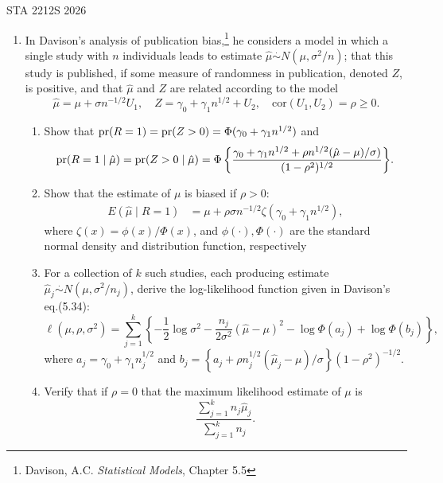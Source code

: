\documentclass[12pt]{article}
\def\dotsim{\stackrel{.}{\sim}}
\def\pr{{\rm pr}}
\newcommand{\1}{\mathds 1}
\begin{document}
 {\hfill STA 2212S 2026}\\


\bigskip

\begin{enumerate}

\item In Davison's analysis of publication bias,\footnote{Davison, A.C. {\it Statistical Models}, Chapter 5.5} he considers a model in which a single study with $n$ individuals leads to estimate $\hat\mu \dotsim N(\mu, \sigma^2/n)$; that this study is published, if some measure of randomness in publication, denoted $Z$, is positive, 
	and that $\hat\mu$ and $Z$ are related according to the model  $$\hat\mu = \mu + \sigma n^{-1/2} U_1, \quad Z = \gamma_0 + \gamma_1n^{1/2} + U_2, \quad \text{cor}(U_1,U_2)=\rho \ge 0.$$ 
	\begin{enumerate}
	\item Show that $\pr(R=1) = \pr(Z > 0) = \Phi(\gamma_0+\gamma_1n^{1/2})$ and 
	$$\displaystyle{\pr(R=1\mid\hat\mu) = \pr(Z > 0 \mid \hat\mu) = \Phi\left\{\frac{\gamma_0 + \gamma_1n^{1/2} + \rho n^{1/2}(\hat\mu-\mu)/\sigma)}{(1-\rho^2)^{1/2}}\right\}}.$$  
	\item  Show that the estimate of $\mu$ is biased if $\rho>0$: \begin{align*}E(\hat\mu \mid R=1) &= \mu+\rho\sigma n^{-1/2}\zeta(\gamma_0+\gamma_1 n^{1/2}), %
	\end{align*} where $\zeta(x) = \phi(x)/\Phi(x)$, and $\phi(\cdot), \Phi(\cdot)$ are the standard normal density and distribution function, respectively
	\item For a collection of $k$ such studies, each producing estimate $\hat\mu_j \dotsim N(\mu, \sigma^2/n_j)$, derive the log-likelihood function given in Davison's eq.(5.34): $$ \ell(\mu,\rho, \sigma^2) = \sum_{j=1}^k \left\{-\frac{1}{2}\log\sigma^2 - \frac{n_j}{2\sigma^2}(\hat\mu-\mu)^2 - \log\Phi(a_j)+\log\Phi(b_j) \right\}, $$
	where $a_j = \gamma_0+\gamma_1n_j^{1/2}$ and $ b_j = \left\{a_j+\rho n_j^{1/2}(\hat\mu_j-\mu)/\sigma\right\}(1-\rho^2)^{-1/2}$.
	\item Verify that if $\rho=0$ that the maximum likelihood estimate of $\mu$ is $$\frac{\sum_{j=1}^k n_j\hat\mu_j}{\sum_{j=1}^k n_j}.$$
\end{enumerate}


\end{enumerate}
\end{document}
